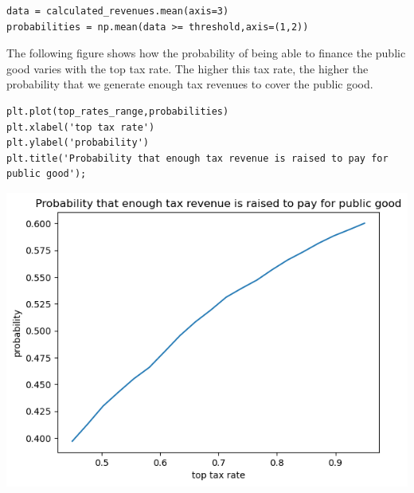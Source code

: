 \documentclass[11pt]{article}
\begin{document}
\begin{verbatim}
data = calculated_revenues.mean(axis=3)
probabilities = np.mean(data >= threshold,axis=(1,2))
\end{verbatim}

The following figure shows how the probability of being able to finance the public good varies with the top tax rate. The higher this tax rate, the higher the probability that we generate enough tax revenues to cover the public good.

\begin{verbatim}
plt.plot(top_rates_range,probabilities)
plt.xlabel('top tax rate')
plt.ylabel('probability')
plt.title('Probability that enough tax revenue is raised to pay for public good');
\end{verbatim}

\begin{center}
\includegraphics[width=.9\linewidth]{./figures/probabilities.png}
\label{}
\end{center}
\end{document}
